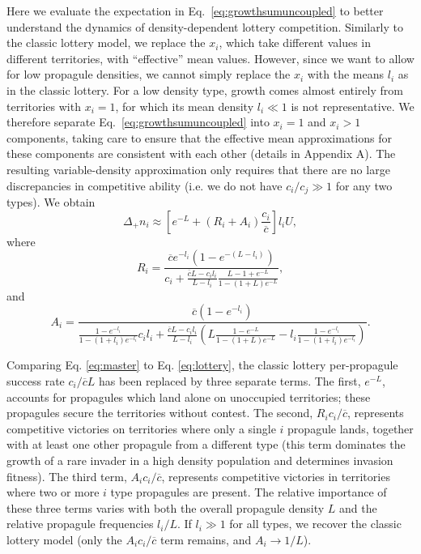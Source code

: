 \documentclass[12pt]{article}
\begin{document}
Here we evaluate the expectation in Eq.~\eqref{eq:growthsumuncoupled} to better understand the dynamics of density-dependent lottery competition. Similarly to the classic lottery model, we replace the $x_i$, which take different values in different territories, with ``effective'' mean values. However, since we want to allow for low propagule densities, we cannot simply replace the $x_i$ with the means $l_i$ as in the classic lottery. For a low density type, growth comes almost entirely from territories with $x_i=1$, for which its mean density $l_i\ll 1$ is not representative. We therefore separate Eq.~\eqref{eq:growthsumuncoupled} into $x_i=1$ and $x_i>1$ components, taking care to ensure that the effective mean approximations for these components are consistent with each other (details in Appendix A). The resulting variable-density approximation only requires that there are no large discrepancies in competitive ability (i.e. we do not have $c_i/c_j\gg 1$ for any two types). We obtain
\begin{equation}
\Delta_+ n_i\approx \left[e^{-L}+(R_i+A_i)\frac{c_i}{\overline{c}}\right]l_i U, \label{eq:master}
\end{equation}
where
\begin{equation}
R_i=\frac{\overline{c}e^{-l_i}(1-e^{-(L-l_i)})}{c_i +\frac{\overline{c}L- c_il_i}{L-l_i}\frac{L-1+e^{-L}}{1-(1+L)e^{-L}}},\nonumber \label{eq:Dr}
\end{equation}
and
\begin{equation}
A_i=\frac{\overline{c}(1-e^{-l_i})}{\frac{1-e^{-l_i}}{1-(1+l_i)e^{-l_i}}c_il_i+\frac{\overline{c}L- c_il_i}{L-l_i}\left(L\frac{1-e^{-L}}{1-(1+L)e^{-L}}-l_i\frac{1-e^{-l_i}}{1-(1+l_i)e^{-l_i}}\right)}. \nonumber \label{eq:Da}
\end{equation}

Comparing Eq. \eqref{eq:master} to Eq. \eqref{eq:lottery}, the classic lottery per-propagule success rate $c_i/\overline{c}L$ has been replaced by three separate terms. The first, $e^{-L}$, accounts for propagules which land alone on unoccupied territories; these propagules secure the territories without contest. The second, $R_i c_i/\overline{c}$, represents competitive victories on territories where only a single $i$ propagule lands, together with at least one other propagule from a different type (this term dominates the growth of a rare invader in a high density population and determines invasion fitness). The third term, $A_i c_i/\overline{c}$, represents competitive victories in territories where two or more $i$ type propagules are present. The relative importance of these three terms varies with both the overall propagule density $L$ and the relative propagule frequencies $l_i/L$. If $l_i\gg 1$ for all types, we recover the classic lottery model (only the $A_ic_i/\overline{c}$ term remains, and $A_i\rightarrow 1/L$). 
\end{document}
